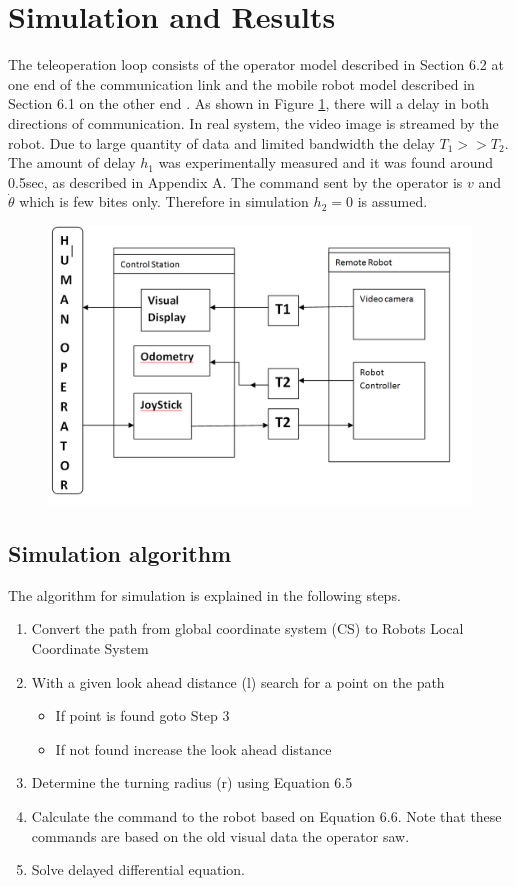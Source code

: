 \section{Simulation and Results }

The teleoperation loop consists of the operator model described in Section 6.2 at one end of the communication link and the mobile robot model described in Section 6.1 on the other end . As shown in Figure \ref{fig:teleloop}, there will a delay in both directions of communication. In real system, the video image is streamed  by the robot. Due to large quantity of data and limited bandwidth the delay $T_1>>T_2$. The amount of delay $h_1$ was experimentally measured  and it was found around 0.5sec, as described in Appendix A. The command sent by the operator is  $v$ and $\dot{\theta}$ which is few bites only.  Therefore in simulation  $h_2=0$ is assumed.


\begin{figure}
	\includegraphics[width=\linewidth,keepaspectratio]{Chapter6/fig/BlockTimeDelay}
	\label{fig:teleloop} 
\end{figure}


\subsection{Simulation algorithm} 
The algorithm for simulation is explained in the following steps.
\begin{enumerate}
\item Convert the path from global coordinate system (CS) to Robots Local Coordinate System
\item With a given look ahead distance (l) search for a point on the path
\begin{itemize}
\item If point is found goto Step 3
\item If not found increase the look ahead distance 
\end{itemize}
\item Determine the turning radius (r) using Equation 6.5
\item Calculate the command to the robot based on Equation 6.6. Note that these commands are based on the old visual data the operator saw.
\item Solve delayed  differential equation.
\end{enumerate}

